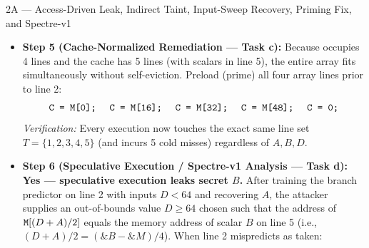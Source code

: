\begin{templatebox}{2A --- Access-Driven Leak, Indirect Taint, Input-Sweep Recovery, Priming Fix, and Spectre-v1}
\begin{itemize}
  \item \textbf{Step 5 (Cache-Normalized Remediation --- Task c):}
  Because  occupies 4 lines and the cache has 5 lines (with scalars in line 5), the entire array fits simultaneously without self-eviction. Preload (prime) all four array lines prior to line 2:
  \[
    \texttt{C = M[0]; \; C = M[16]; \; C = M[32]; \; C = M[48]; \; C = 0;}
  \]
  \emph{Verification:} Every execution now touches the exact same line set $T = \{1, 2, 3, 4, 5\}$ (and incurs 5 cold misses) regardless of $A, B, D$.

  \item \textbf{Step 6 (Speculative Execution / Spectre-v1 Analysis --- Task d):}
  \textbf{Yes --- speculative execution leaks secret $B$.} After training the branch predictor on line 2 with inputs $D < 64$ and recovering $A$, the attacker supplies an out-of-bounds value $D \ge 64$ chosen such that the address of $\texttt{M}[(D+A)/2]$ equals the memory address of scalar $B$ on line 5 (i.e., $(D + A)/2 = (\&B - \&M)/4$). When line 2 mispredicts as taken:
\end{itemize}
\end{templatebox}

